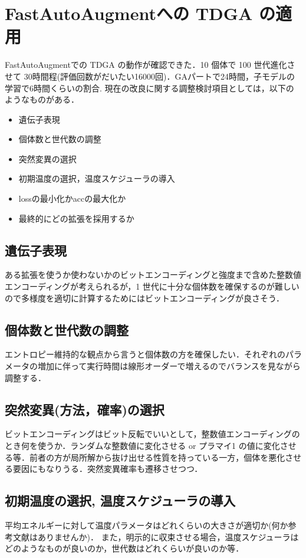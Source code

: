 \documentclass[onecolumn]{ujarticle}   %
\begin{document}
	\section{FastAutoAugmentへの TDGA の適用}
  FastAutoAugmentでの TDGA の動作が確認できた．10 個体で 100 世代進化させて 30時間程(評価回数がだいたい16000回)．GAパートで24時間，子モデルの学習で6時間くらいの割合.
  現在の改良に関する調整検討項目としては，以下のようなものがある．

  \begin{itemize}
    \item{遺伝子表現}
    \item{個体数と世代数の調整}
    \item{突然変異の選択}
    \item{初期温度の選択，温度スケジューラの導入}
    \item{lossの最小化かaccの最大化か}
    \item{最終的にどの拡張を採用するか}
  \end{itemize}

  \subsection{遺伝子表現}
  ある拡張を使うか使わないかのビットエンコーディングと強度まで含めた整数値エンコーディングが考えられるが，1 世代に十分な個体数を確保するのが難しいので多様度を適切に計算するためにはビットエンコーディングが良さそう．

  \subsection{個体数と世代数の調整}
  エントロピー維持的な観点から言うと個体数の方を確保したい．それぞれのパラメータの増加に伴って実行時間は線形オーダーで増えるのでバランスを見ながら調整する．

  \subsection{突然変異(方法，確率)の選択}
  ビットエンコーディングはビット反転でいいとして，整数値エンコーディングのとき何を使うか．ランダムな整数値に変化させる or プラマイ1 の値に変化させる等．前者の方が局所解から抜け出せる性質を持っている一方，個体を悪化させる要因にもなりうる．突然変異確率も遷移させつつ．

  \subsection{初期温度の選択, 温度スケジューラの導入}
  平均エネルギーに対して温度パラメータはどれくらいの大きさが適切か(何か参考文献はありませんか)．
  また，明示的に収束させる場合，温度スケジューラはどのようなものが良いのか，世代数はどれくらいが良いのか等．
\end{document}
